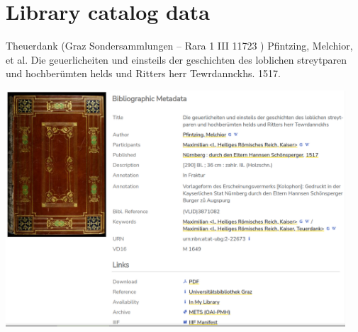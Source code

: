 
\section{Library catalog data}
\begin{frame}{Theuerdank (Graz Sondersammlungen -- Rara 1 III 11723 )}
\footnotesize
    Pfintzing, Melchior, et al. Die geuerlicheiten und einsteils der geschichten des loblichen streytparen und hochberümten helds und Ritters herr Tewrdannckhs. 1517.

    \includegraphics[width=0.95\textwidth]{img/theuerdank-biblio.png}
\end{frame}

